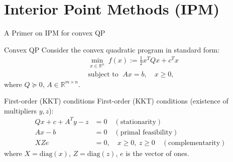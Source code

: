\section{Interior Point Methods (IPM)}
\label{Sec:ipm}




\begin{frame}{A Primer on IPM for convex QP}
  \begin{block}{Convex QP}
Consider the convex quadratic program in standard form:
\begin{align*}
  &\min_{x\in\mathbb{R}^n} \; f(x) := \tfrac{1}{2}x^T Q x + c^T x\\
  &\text{subject to }\; A x = b, \quad x \ge 0,
\end{align*}
where $Q\succeq 0$, $A\in\mathbb{R}^{m\times n}$.
\end{block}
\begin{block}{First-order (KKT) conditions}
First-order (KKT) conditions (existence of multipliers $y,z$):
\begin{align*}
  Qx + c + A^T y - z &= 0 \quad (\text{stationarity})\\
  Ax - b &= 0 \quad (\text{primal feasibility})\\
  X Z e &= 0,\quad x\ge0,\ z\ge0 \quad(\text{complementarity})
\end{align*}
where $X=\mathrm{diag}(x)$, $Z=\mathrm{diag}(z)$, $e$ is the vector of ones.
\end{block}


\end{frame}

